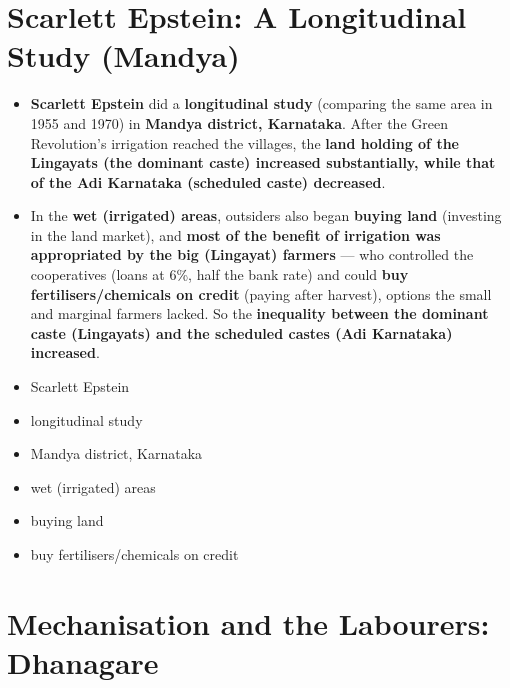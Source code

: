 \section{Scarlett Epstein: A Longitudinal Study (Mandya)}

\begin{KeyConcept}
\begin{itemize}
\item \textbf{Scarlett Epstein} did a \textbf{longitudinal study} (comparing the same area in 1955 and 1970) in \textbf{Mandya district, Karnataka}. After the Green Revolution's irrigation reached the villages, the \textbf{land holding of the Lingayats (the dominant caste) increased substantially, while that of the Adi Karnataka (scheduled caste) decreased}.
\item In the \textbf{wet (irrigated) areas}, outsiders also began \textbf{buying land} (investing in the land market), and \textbf{most of the benefit of irrigation was appropriated by the big (Lingayat) farmers} --- who controlled the cooperatives (loans at 6\%, half the bank rate) and could \textbf{buy fertilisers/chemicals on credit} (paying after harvest), options the small and marginal farmers lacked. So the \textbf{inequality between the dominant caste (Lingayats) and the scheduled castes (Adi Karnataka) increased}.
\end{itemize}
\end{KeyConcept}

\begin{QuickRevision}
\begin{itemize}
\item Scarlett Epstein
\item longitudinal study
\item Mandya district, Karnataka
\item wet (irrigated) areas
\item buying land
\item buy fertilisers/chemicals on credit
\end{itemize}
\end{QuickRevision}

\section{Mechanisation and the Labourers: Dhanagare}

